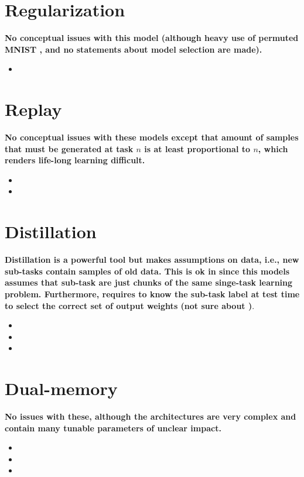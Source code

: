 \documentclass{article}
\begin{document}
\section{Regularization}
\textbf{No conceptual issues with this model (although heavy use of permuted MNIST , and no statements about model selection are made).}
\begin{itemize}
\item {}
\end{itemize}

\section{Replay}
\textbf{No conceptual issues with these models except that amount of samples that must be generated at task $n$ is at least proportional to $n$, which renders life-long learning difficult.}
\begin{itemize}
\item {}
\item {}
\end{itemize}

\section{Distillation}
\textbf{Distillation is a powerful tool but makes assumptions on data, i.e., new sub-tasks contain samples of old data.
This is ok in \cite{kim2018keep} since this models assumes that sub-task are just chunks of the same singe-task learning problem.  Furthermore, \cite{li2018learning} requires to know the sub-task label at test time to select the correct set of output weights (not sure about \cite{kim2018keep})}.
\begin{itemize}
\item {}
\item {}
\item {}
\end{itemize}

\section{Dual-memory}
\textbf{No issues with these, although the architectures are very complex and contain many tunable parameters of unclear impact.}
\begin{itemize}
\item {}
\item {}
\item {}
\end{itemize}

\nocite{*}

\clearpage


\end{document}

